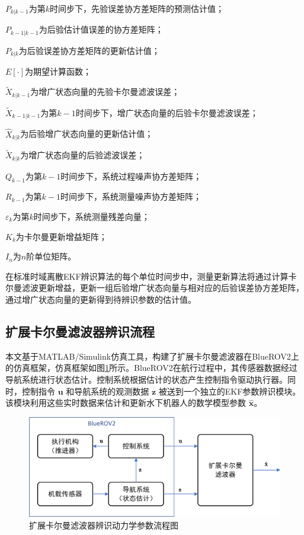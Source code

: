 $P_{k|k-1}$为第$k$时间步下，先验误差协方差矩阵的预测估计值；

$P_{k-1|k-1}$为后验估计值误差的协方差矩阵；

$P_{k|k}$为后验误差协方差矩阵的更新估计值；

$E[\cdot]$为期望计算函数；

$\tilde{X}_{k|k-1}$为增广状态向量的先验卡尔曼滤波误差；

$\tilde{X}_{k-1|k-1}$为第$k-1$时间步下，增广状态向量的后验卡尔曼滤波误差；

$\hat{X}_{k|k}$为后验增广状态向量的更新估计值；

$\tilde{X}_{k|k}$为增广状态向量的后验滤波误差；

$Q_{k-1}$为第$k-1$时间步下，系统过程噪声协方差矩阵；

$R_{k-1}$为第$k-1$时间步下，系统测量噪声协方差矩阵；

$\varepsilon_k$为第$k$时间步下，系统测量残差向量；

$K_k$为卡尔曼更新增益矩阵；

$I_n$为$n$阶单位矩阵。

在标准时域离散EKF辨识算法的每个单位时间步中，测量更新算法将通过计算卡尔曼滤波更新增益，更新一组后验增广状态向量与相对应的后验误差协方差矩阵，通过增广状态向量的更新得到待辨识参数的估计值。

\subsection{扩展卡尔曼滤波器辨识流程}

本文基于MATLAB/Simulink仿真工具，构建了扩展卡尔曼滤波器在BlueROV2上的仿真框架\cite{munguiaEKFBasedParameterIdentification2019}，仿真框架如图\ref{f.EKF_ident_frame}所示。BlueROV2在航行过程中，其传感器数据经过导航系统进行状态估计。控制系统根据估计的状态产生控制指令驱动执行器。同时，控制指令 $\symbf{u}$ 和导航系统的观测数据 $\symbf{z}$ 被送到一个独立的EKF参数辨识模块。该模块利用这些实时数据来估计和更新水下机器人的数学模型参数 $\hat{\symbf{x}}$。

\begin{figure}[hbt]
    \centering
    \includegraphics[width=0.7\linewidth]{images/chapter3/卡尔曼滤波辨识流程图.png}
    \caption{扩展卡尔曼滤波器辨识动力学参数流程图}
    \label{f.EKF_ident_frame}
\end{figure}

